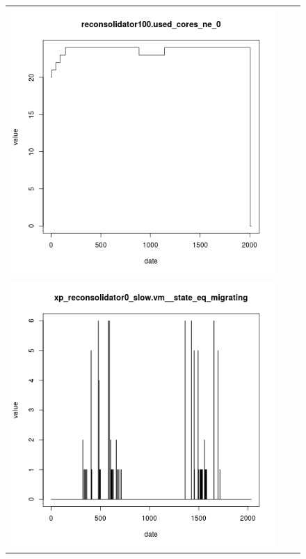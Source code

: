 \documentclass[parallelisme]{compas2017}
\begin{document}
\begin{figure}[h]
\begin{tabular}{ccc}
\includegraphics[scale=0.30]{reconsolidator100_used_cores_ne_0}\\
\includegraphics[scale=0.30]{xp_reconsolidator0_slow_vm__state_eq_migrating}&

\end{tabular}
\end{figure}
\end{document}
